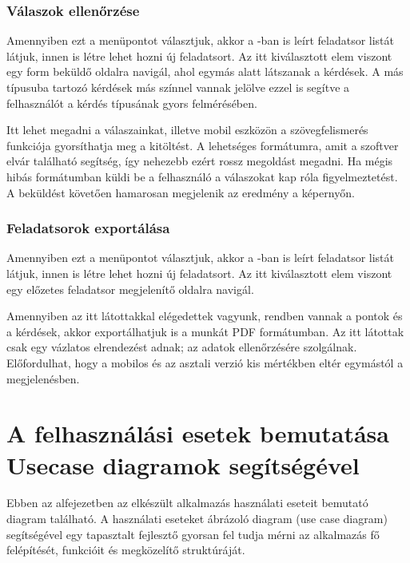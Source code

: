\subsubsection{Válaszok ellenőrzése}

Amennyiben ezt a menüpontot választjuk, akkor a -ban is leírt feladatsor listát látjuk, innen is létre lehet hozni új feladatsort.
Az itt kiválasztott elem viszont egy form beküldő oldalra navigál, ahol egymás alatt látszanak a kérdések.
A más típusuba tartozó kérdések más színnel vannak jelölve ezzel is segítve a felhasználót a kérdés típusának gyors felmérésében.

Itt lehet megadni a válaszainkat, illetve mobil eszközön a szövegfelismerés funkciója gyorsíthatja meg a kitöltést.
A lehetséges formátumra, amit a szoftver elvár található segítség, így nehezebb ezért rossz megoldást megadni.
Ha mégis hibás formátumban küldi be a felhasználó a válaszokat kap róla figyelmeztetést.
A beküldést követően hamarosan megjelenik az eredmény a képernyőn.

\subsubsection{Feladatsorok exportálása}

Amennyiben ezt a menüpontot választjuk, akkor a -ban is leírt feladatsor listát látjuk, innen is létre lehet hozni új feladatsort.
Az itt kiválasztott elem viszont egy előzetes feladatsor megjelenítő oldalra navigál.

Amennyiben az itt látottakkal elégedettek vagyunk, rendben vannak a pontok és a kérdések, akkor exportálhatjuk is a munkát PDF formátumban.
Az itt látottak csak egy vázlatos elrendezést adnak; az adatok ellenőrzésére szolgálnak.
Előfordulhat, hogy a mobilos és az asztali verzió kis mértékben eltér egymástól a megjelenésben.

\section{A felhasználási esetek bemutatása Usecase diagramok segítségével}
\label{sec:SpecificationDiagrams}

Ebben az alfejezetben az elkészült alkalmazás használati eseteit bemutató diagram található.  
A használati eseteket ábrázoló diagram (use case diagram) segítségével egy tapasztalt fejlesztő gyorsan fel tudja mérni az alkalmazás fő felépítését, funkcióit és megközelítő struktúráját.


